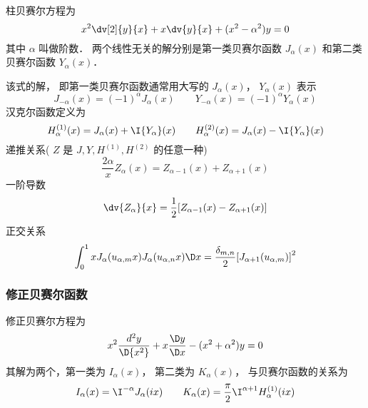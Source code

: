 
柱贝赛尔方程为
  \begin{equation}
{x^2}\dv[2]{y}{x} + x\dv{y}{x} + (x^2 - \alpha ^2)y = 0
\end{equation}
其中 $\alpha $ 叫做阶数． 两个线性无关的解分别是第一类贝赛尔函数 ${J_\alpha }(x)$ 和第二类贝赛尔函数 ${Y_\alpha }(x)$． 

该式的解， 即第一类贝赛尔函数通常用大写的 ${J_\alpha }(x)$，  ${Y_\alpha }(x)$ 表示
 \begin{equation}
 {J_{ - \alpha }}(x) = {( - 1)^\alpha }{J_\alpha }(x)
 \qquad
 {Y_{ - \alpha }}(x) = {( - 1)^\alpha }{Y_\alpha }(x)
\end{equation}
汉克尔函数定义为
 \begin{equation}
 H_\alpha ^{(1)}(x) = {J_\alpha }(x) + \I{Y_\alpha }(x)
 \qquad
 H_\alpha ^{(2)}(x) = {J_\alpha }(x) - \I{Y_\alpha }(x)
\end{equation} 
递推关系( $Z$ 是 $J,Y,{H^{(1)}},{H^{(2)}}$ 的任意一种)
 \begin{equation}
\frac{{2\alpha }}{x}{Z_\alpha }(x) = {Z_{\alpha  - 1}}(x) + {Z_{\alpha  + 1}}(x)
\end{equation}
一阶导数
  \begin{equation}
\dv{Z_\alpha}{x} = \frac{1}{2}[{Z_{\alpha  - 1}}(x) - {Z_{\alpha {\rm{ + }}1}}(x)]
\end{equation}
正交关系
  \begin{equation}
\int_0^1 {x{J_\alpha }({u_{\alpha ,m}}x){J_\alpha }({u_{\alpha ,n}}x)\D x = \frac{{{\delta _{m,n}}}}{2}{{[{J_{\alpha  + 1}}({u_{\alpha ,m}})]}^2}} 
\end{equation}

\subsubsection{修正贝赛尔函数}
修正贝赛尔方程为
  \begin{equation}
{x^2}\frac{{{d^2}y}}{{\D {x^2}}} + x\frac{{\D y}}{{\D x}} - ({x^2} + {\alpha ^2})y = 0
\end{equation}
其解为两个，第一类为 ${I_\alpha }(x)$，  第二类为 ${K_\alpha }(x)$，  与贝赛尔函数的关系为
 \begin{equation}
{I_\alpha }(x) = {\I^{ - \alpha }}{J_\alpha }(ix)
\qquad
{K_\alpha }(x) = \frac{\pi }{2}{\I^{\alpha  + 1}}H_\alpha ^{(1)}(ix)
\end{equation}

